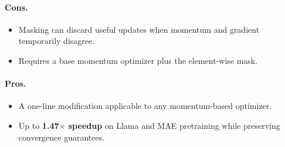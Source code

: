 \paragraph{Cons.}
\begin{itemize}[leftmargin=*]
\item Masking can discard useful updates when momentum and gradient temporarily disagree.
\item Requires a base momentum optimizer plus the element-wise mask.
\end{itemize}

\paragraph{Pros.}
\begin{itemize}[leftmargin=*]
\item A one-line modification applicable to any momentum-based optimizer.
\item Up to \textbf{1.47$\times$ speedup} on Llama and MAE pretraining while preserving convergence guarantees.
\end{itemize}


